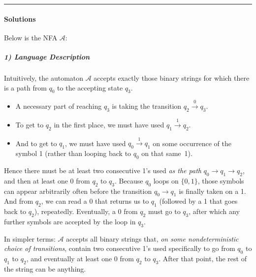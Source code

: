 \documentclass{article}
\begin{document}
\bigskip
\hrule
\bigskip

\paragraph*{Solutions}

Below is the NFA $\mathcal{A}$:

\begin{center}
\end{center}

\subparagraph*{1) Language Description}
Intuitively, the automaton $\mathcal{A}$ accepts exactly those binary strings for which there is a path from $q_0$ to the accepting state $q_3$.  
\begin{itemize}
\item A necessary part of reaching $q_3$ is taking the transition $q_2 \xrightarrow{0} q_3$. 
\item To get to $q_2$ in the first place, we must have used $q_1 \xrightarrow{1} q_2$. 
\item And to get to $q_1$, we must have used $q_0 \xrightarrow{1} q_1$ on some occurrence of the symbol 1 (rather than looping back to $q_0$ on that same~1).
\end{itemize}
Hence there must be at least two consecutive 1's used \emph{as the path} $q_0 \to q_1 \to q_2$, and then at least one 0 from $q_2$ to $q_3$.  Because $q_0$ loops on $\{0,1\}$, those symbols can appear arbitrarily often before the transition $q_0\to q_1$ is finally taken on a 1.  And from $q_2$, we can read a 0 that returns us to $q_1$ (followed by a 1 that goes back to $q_2$), repeatedly.  Eventually, a 0 from $q_2$ must go to $q_3$, after which any further symbols are accepted by the loop in $q_3$.  

In simpler terms: $\mathcal{A}$ accepts all binary strings that, \emph{on some nondeterministic choice of transitions}, contain two consecutive 1's used specifically to go from $q_0$ to $q_1$ to $q_2$, and eventually at least one 0 from $q_2$ to $q_3$.  After that point, the rest of the string can be anything.  
\end{document}
